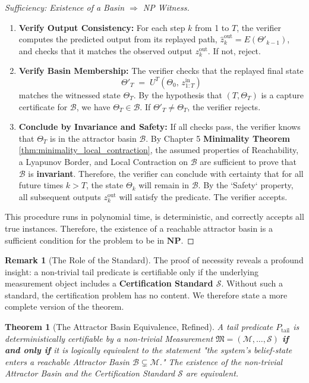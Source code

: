 \documentclass[12pt]{article}
\theoremstyle{definition}
\newtheorem{remark}{Remark}[section]
\theoremstyle{plain}
\newtheorem{theorem}{Theorem}[section]
\begin{document}
\begin{proof}[Sufficiency: Existence of a Basin $\Rightarrow$ NP Witness]
\begin{enumerate}
    \item \textbf{Verify Output Consistency:} For each step $k$ from 1 to $T$, the verifier computes the predicted output from its replayed path, $\widehat{z}^{\text{out}}_k = E(\Theta'_{k-1})$, and checks that it matches the observed output $z^{\text{out}}_k$. If not, reject.

    \item \textbf{Verify Basin Membership:} The verifier checks that the replayed final state 
    \[
    \Theta'_T \;=\; U^T(\Theta_0,\,z^{\text{in}}_{1:T})
    \]
    matches the witnessed state $\Theta_T$.  By the hypothesis that $(T,\Theta_T)$ is a capture certificate for $\mathcal{B}$, we have $\Theta_T \in \mathcal{B}$.  If $\Theta'_T\neq\Theta_T$, the verifier rejects.
    

    \item \textbf{Conclude by Invariance and Safety:} If all checks pass, the verifier knows that $\Theta_T$ is in the attractor basin $\mathcal{B}$. By Chapter 5 \textbf{Minimality Theorem} \ref{thm:minimality_local_contraction}, the assumed properties of Reachability, a Lyapunov Border, and Local Contraction on $\mathcal{B}$ are sufficient to prove that $\mathcal{B}$ is \textbf{invariant}. Therefore, the verifier can conclude with certainty that for all future times $k > T$, the state $\Theta_k$ will remain in $\mathcal{B}$. By the `Safety` property, all subsequent outputs $z^{\text{out}}_k$ will satisfy the predicate. The verifier accepts.
\end{enumerate}

This procedure runs in polynomial time, is deterministic, and correctly accepts all true instances. Therefore, the existence of a reachable attractor basin is a sufficient condition for the problem to be in $\mathbf{NP}$.
\end{proof}

\begin{remark}[The Role of the Standard]
The proof of necessity reveals a profound insight: a non-trivial tail predicate is certifiable only if the underlying measurement object includes a \textbf{Certification Standard $\mathcal{S}$}. Without such a standard, the certification problem has no content. We therefore state a more complete version of the theorem.
\end{remark}

\begin{theorem}[The Attractor Basin Equivalence, Refined]
A tail predicate $P_{\text{tail}}$ is deterministically certifiable by a non-trivial Measurement $\mathfrak{M} = (\mathcal{M}, \dots, \mathcal{S})$ \textbf{if and only if} it is logically equivalent to the statement "the system's belief-state enters a reachable Attractor Basin $\mathcal{B} \subsetneq \mathcal{M}$." The existence of the non-trivial Attractor Basin and the Certification Standard $\mathcal{S}$ are equivalent.
\end{theorem}
\end{document}
